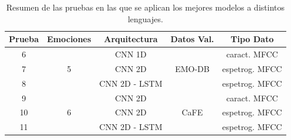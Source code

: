 \documentclass[11pt,a4paper,spanish]{book}
\begin{document}
	\begin{table}[H]
		\centering
		\begin{center}
			\begin{tabular}{| c | c | c | c | c |}
				\hline
				\textbf{Prueba} &
				\textbf{Emociones}& 
				\textbf{Arquitectura} & 
				\textbf{Datos Val.} & 
				\textbf{Tipo Dato} \\ 
				\hline\hline
				6 & \multirow{3}{*}{5} & CNN 1D & \multirow{3}{*}{EMO-DB} & caract. MFCC\\ 
				7 &  & CNN 2D &  & espetrog. MFCC\\ 
				8 &  & CNN 2D - LSTM &  & espetrog. MFCC\\ \hline
				9 & \multirow{3}{*}{6} & CNN 2D & \multirow{3}{*}{CaFE} & caract. MFCC\\  
				10 &  & CNN 2D &  & espetrog. MFCC\\ 
				11 &  & CNN 2D - LSTM &  & espetrog. MFCC\\
				\hline
				
			\end{tabular}
			
			\caption{Resumen de las pruebas en las que se aplican los mejores modelos a distintos lenguajes.}
			\label{tab:resumenTests2}
		\end{center}
	\end{table}


	
	
		\printbibliography
	
\end{document}
